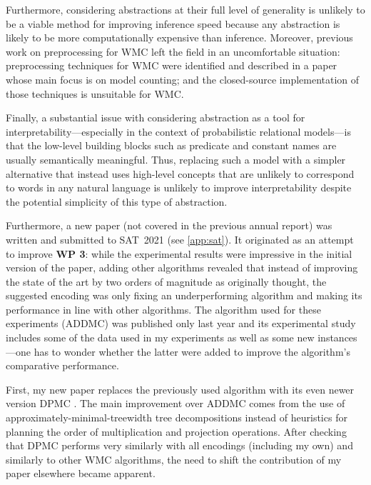 \documentclass{article}
\begin{document}
\begin{description}
  Furthermore, considering abstractions at their full level of generality is
  unlikely to be a viable method for improving inference speed because any
  abstraction is likely to be more computationally expensive than inference.
  Moreover, previous work on preprocessing for WMC left the field in an
  uncomfortable situation: preprocessing techniques for WMC were identified and
  described in a paper \cite{DBLP:conf/aaai/LagniezM14} whose main focus is on
  model counting; and the closed-source implementation of those techniques is
  unsuitable for WMC.

  Finally, a substantial issue with considering abstraction as a tool for
  interpretability---especially in the context of probabilistic relational
  models---is that the low-level building blocks such as predicate and constant
  names are usually semantically meaningful. Thus, replacing such a model with a
  simpler alternative that instead uses high-level concepts that are unlikely to
  correspond to words in any natural language is unlikely to improve
  interpretability despite the potential simplicity of this type of abstraction.
\item Furthermore, a new paper (not covered in the previous annual report) was
  written and submitted to SAT~2021 (see \cref{app:sat}). It originated as an
  attempt to improve \textbf{WP 3}: while the experimental results were
  impressive in the initial version of the paper, adding other algorithms
  revealed that instead of improving the state of the art by two orders of
  magnitude as originally thought, the suggested encoding was only fixing an
  underperforming algorithm and making its performance in line with other
  algorithms. The algorithm used for these experiments (ADDMC) was published
  only last year \cite{DBLP:conf/aaai/DudekPV20} and its experimental study
  includes some of the data used in my experiments as well as some new
  instances---one has to wonder whether the latter were added to improve the
  algorithm's comparative performance.

  First, my new paper replaces the previously used algorithm with its even newer
  version DPMC \cite{DBLP:conf/cp/DudekPV20}. The main improvement over ADDMC
  comes from the use of approximately-minimal-treewidth tree decompositions
  instead of heuristics for planning the order of multiplication and projection
  operations. After checking that DPMC performs very similarly with all
  encodings (including my own) and similarly to other WMC algorithms, the need
  to shift the contribution of my paper elsewhere became apparent.


\end{description}
\end{document}
